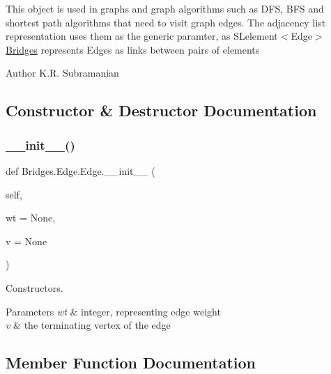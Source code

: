This object is used in graphs and graph algorithms such as D\+FS, B\+FS and shortest path algorithms that need to visit graph edges. The adjacency list representation uses them as the generic paramter, as S\+Lelement$<$\+Edge$>$ \mbox{\hyperlink{namespace_bridges_1_1_bridges}{Bridges}} represents Edges as links between pairs of elements

\begin{DoxyAuthor}{Author}
K.\+R. Subramanian 
\end{DoxyAuthor}


\subsection{Constructor \& Destructor Documentation}
\mbox{\label{class_bridges_1_1_edge_1_1_edge_a52aedc015b8b0b4d4ac55a74c0c7e217}} 
\subsubsection{\texorpdfstring{\+\_\+\+\_\+init\+\_\+\+\_\+()}{\_\_init\_\_()}}
{\footnotesize\ttfamily def Bridges.\+Edge.\+Edge.\+\_\+\+\_\+init\+\_\+\+\_\+ (\begin{DoxyParamCaption}\item[{}]{self,  }\item[{}]{wt = {\ttfamily None},  }\item[{}]{v = {\ttfamily None} }\end{DoxyParamCaption})}



Constructors. 


\begin{DoxyParams}{Parameters}
{\em wt} & integer, representing edge weight \\
\hline
{\em v} & the terminating vertex of the edge \\
\hline
\end{DoxyParams}


\subsection{Member Function Documentation}
\mbox{\label{class_bridges_1_1_edge_1_1_edge_a96ac5e5acb598afb3d417627deb120fc}} 
